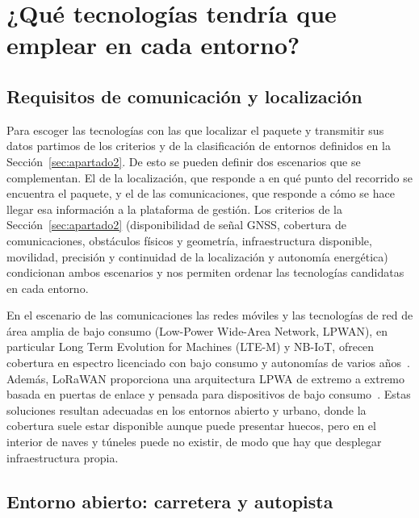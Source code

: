 \documentclass[11pt,a4paper]{article}
\begin{document}
\clearpage
\section{¿Qué tecnologías tendría que emplear en cada entorno?}
\label{sec:apartado3}

\subsection{Requisitos de comunicación y localización}
\label{sec:apartado3_1}

Para escoger las tecnologías con las que localizar el paquete y transmitir sus datos partimos de los criterios y de la clasificación de entornos definidos en la Sección~\ref{sec:apartado2}. De esto se pueden definir dos escenarios que se complementan. El de la localización, que responde a en qué punto del recorrido se encuentra el paquete, y el de las comunicaciones, que responde a cómo se hace llegar esa información a la plataforma de gestión. Los criterios de la Sección~\ref{sec:apartado2} (disponibilidad de señal GNSS, cobertura de comunicaciones, obstáculos físicos y geometría, infraestructura disponible, movilidad, precisión y continuidad de la localización y autonomía energética) condicionan ambos escenarios y nos permiten ordenar las tecnologías candidatas en cada entorno.

En el escenario de las comunicaciones las redes móviles y las tecnologías de red de área amplia de bajo consumo (Low-Power Wide-Area Network, LPWAN), en particular Long Term Evolution for Machines (LTE-M) y NB-IoT, ofrecen cobertura en espectro licenciado con bajo consumo y autonomías de varios años~\cite{ref12}. Además, LoRaWAN proporciona una arquitectura LPWA de extremo a extremo basada en puertas de enlace y pensada para dispositivos de bajo consumo~\cite{ref13}. Estas soluciones resultan adecuadas en los entornos abierto y urbano, donde la cobertura suele estar disponible aunque puede presentar huecos, pero en el interior de naves y túneles puede no existir, de modo que hay que desplegar infraestructura propia.

\subsection{Entorno abierto: carretera y autopista}
\label{sec:apartado3_2}
\end{document}
